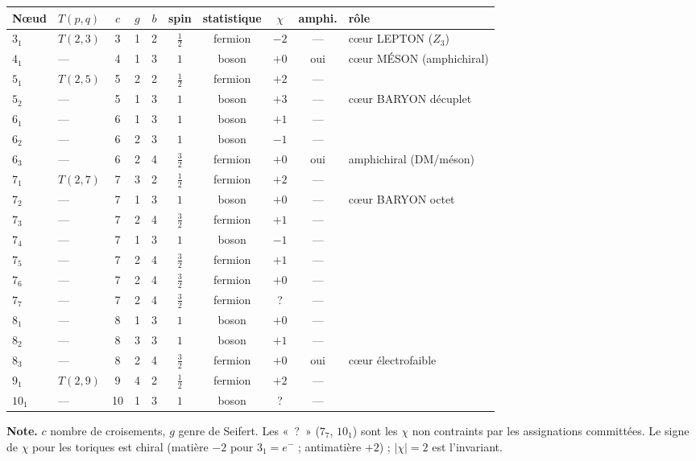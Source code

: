 \documentclass[11pt]{article}
\begin{document}
\begin{center}
\footnotesize
\begin{longtable}{@{}llcccccccl@{}}
\toprule
Nœud & $T(p,q)$ & $c$ & $g$ & $b$ & spin & statistique & $\chi$ & amphi. & rôle \\
\midrule
\endhead
$3_{1}$ & $T(2,3)$ & 3 & 1 & 2 & $\tfrac12$ & fermion & $-2$ & --- & c\oe ur LEPTON ($Z_3$) \\
$4_{1}$ & --- & 4 & 1 & 3 & $1$ & boson & $+0$ & oui & c\oe ur M\'ESON (amphichiral) \\
$5_{1}$ & $T(2,5)$ & 5 & 2 & 2 & $\tfrac12$ & fermion & $+2$ & --- &  \\
$5_{2}$ & --- & 5 & 1 & 3 & $1$ & boson & $+3$ & --- & c\oe ur BARYON d\'ecuplet \\
$6_{1}$ & --- & 6 & 1 & 3 & $1$ & boson & $+1$ & --- &  \\
$6_{2}$ & --- & 6 & 2 & 3 & $1$ & boson & $-1$ & --- &  \\
$6_{3}$ & --- & 6 & 2 & 4 & $\tfrac32$ & fermion & $+0$ & oui & amphichiral (DM/m\'eson) \\
$7_{1}$ & $T(2,7)$ & 7 & 3 & 2 & $\tfrac12$ & fermion & $+2$ & --- &  \\
$7_{2}$ & --- & 7 & 1 & 3 & $1$ & boson & $+0$ & --- & c\oe ur BARYON octet \\
$7_{3}$ & --- & 7 & 2 & 4 & $\tfrac32$ & fermion & $+1$ & --- &  \\
$7_{4}$ & --- & 7 & 1 & 3 & $1$ & boson & $-1$ & --- &  \\
$7_{5}$ & --- & 7 & 2 & 4 & $\tfrac32$ & fermion & $+1$ & --- &  \\
$7_{6}$ & --- & 7 & 2 & 4 & $\tfrac32$ & fermion & $+0$ & --- &  \\
$7_{7}$ & --- & 7 & 2 & 4 & $\tfrac32$ & fermion & ? & --- &  \\
$8_{1}$ & --- & 8 & 1 & 3 & $1$ & boson & $+0$ & --- &  \\
$8_{2}$ & --- & 8 & 3 & 3 & $1$ & boson & $+1$ & --- &  \\
$8_{3}$ & --- & 8 & 2 & 4 & $\tfrac32$ & fermion & $+0$ & oui & c\oe ur \'electrofaible \\
$9_{1}$ & $T(2,9)$ & 9 & 4 & 2 & $\tfrac12$ & fermion & $+2$ & --- &  \\
$10_{1}$ & --- & 10 & 1 & 3 & $1$ & boson & ? & --- &  \\
\bottomrule
\end{longtable}
\end{center}

\noindent\textbf{Note.} $c$ nombre de croisements, $g$ genre de Seifert. Les «~?~» ($7_7$, $10_1$) sont les $\chi$ non contraints par les assignations committées. Le signe de $\chi$ pour les toriques est chiral (matière $-2$ pour $3_1=e^-$ ; antimatière $+2$) ; $|\chi|=2$ est l'invariant.
\end{document}
